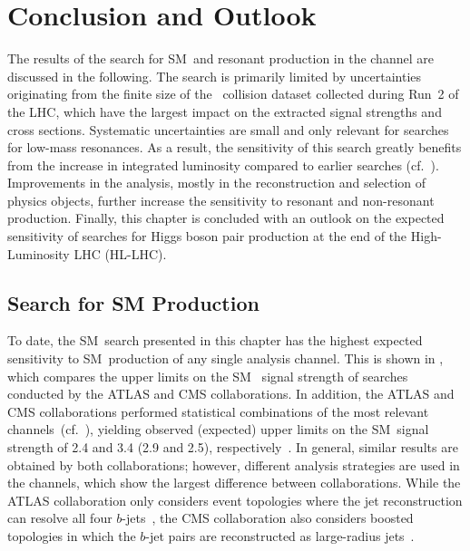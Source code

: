\section{Conclusion and Outlook}%
\label{sec:result_discussion}

The results of the search for SM~\HH and resonant \HH production in the
\bbtautau channel are discussed in the following. The search is primarily
limited by uncertainties originating from the finite size of the \pp~collision
dataset collected during Run~2 of the LHC, which have the largest impact on the
extracted signal strengths and cross sections. Systematic uncertainties are
small and only relevant for searches for low-mass resonances. As a result, the
sensitivity of this search greatly benefits from the increase in integrated
luminosity compared to earlier searches
(cf.~). Improvements in the analysis, mostly in
the reconstruction and selection of physics objects, further increase the
sensitivity to resonant and non-resonant \HH production. Finally, this chapter
is concluded with an outlook on the expected sensitivity of searches for Higgs
boson pair production at the end of the High-Luminosity LHC (HL-LHC).

\subsection{Search for SM \HH Production}

To date, the SM~\HH search presented in this chapter has the highest expected
sensitivity to SM~\HH production of any single analysis channel. This is shown
in , which compares the upper limits on the SM~\HH
signal strength of searches conducted by the ATLAS and CMS collaborations. In
addition, the ATLAS and CMS collaborations performed statistical combinations of
the most relevant channels~(cf.~), yielding observed
(expected) upper limits on the SM~\HH signal strength of 2.4 and 3.4 (2.9 and
2.5), respectively~\cite{HDBS-2022-03,CMS-HIG-22-001}.
In general, similar results are obtained by both collaborations; however,
different analysis strategies are used in the \bbbb channels, which show the
largest difference between collaborations. While the ATLAS collaboration only
considers event topologies where the jet reconstruction can resolve all four
$b$-jets~\cite{HDBS-2019-29}, the CMS collaboration also considers boosted
topologies in which the $b$-jet pairs are reconstructed as large-radius
jets~\cite{CMS-HIG-20-005,CMS-B2G-22-003}.


